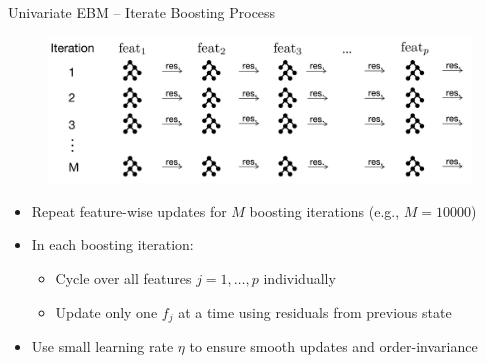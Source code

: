 \documentclass[11pt,compress,t,notes=noshow, aspectratio=169, xcolor=table]{beamer}
\begin{document}
\begin{frame}{Univariate EBM – Iterate Boosting Process}
\begin{figure}
    \centering
    \includegraphics[width=\linewidth]{figure/EBM_Step3.png}
\end{figure}
\begin{itemize}
    \item Repeat feature-wise updates for $M$ boosting iterations (e.g., $M=10000$)
    \item In each boosting iteration:
    \begin{itemize}
        \item Cycle over all features $j=1,\dots,p$ individually %
        \item Update only one $f_j$ at a time using residuals from previous state
    \end{itemize}
    \item Use small learning rate $\eta$ to ensure smooth updates and order-invariance
\end{itemize}
\end{frame}














\end{document}
